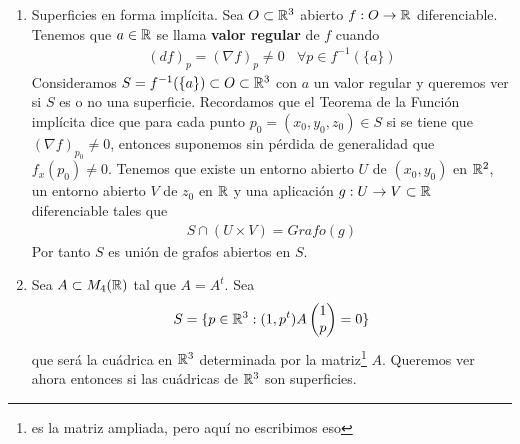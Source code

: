 \begin{ejemplo}
\begin{enumerate}
        Sea $S=S^2(c, R)$, entonces existen una traslación $T$ y una homotecia $H$ de $\bb{R}^3$ tales que 
        \begin{gather*}
            (H\circ T)(S^2) = S^2(c,R)
        \end{gather*}
        por lo que $S^2(c, R)$ es una superficie. Con este razonamiento llegamos a que las elipsoides también son superficies.

        \item Superficies en forma implícita. Sea $O\subset \mathbb{R}^3$ abierto $f:O\to \mathbb{R}$ diferenciable. Tenemos que $a\in \mathbb{R}$ se llama \textbf{valor regular} de $f$ cuando
        \begin{gather*}
            (df)_p = (\nabla f)_p \neq 0 \ \ \ \ \forall p\in f^{-1}(\{a\})
        \end{gather*}
        Consideramos $S=f^{-1}(\{a\})\subset O \subset \mathbb{R}^3$ con $a$ un valor regular y queremos ver si $S$ es o no una superficie. Recordamos que el Teorema de la Función implícita dice que para cada punto $p_0 = (x_0, y_0, z_0)\in S$ si se tiene que $(\nabla f)_{p_0}\neq 0$, entonces suponemos sin pérdida de generalidad que $f_x(p_0)\neq 0$. Tenemos que existe un entorno abierto $U$ de $(x_0,y_0)$ en $\mathbb{R}^2$, un entorno abierto $V$ de $z_0$ en $\mathbb{R}$ y una aplicación $g:U\to V\subset \mathbb{R}$ diferenciable tales que 
        \begin{gather*}
            S \cap (U\times V) = Grafo(g)
        \end{gather*}
        Por tanto $S$ es unión de grafos abiertos en $S$.

        \item Sea $A\subset M_4(\mathbb{R})$ tal que $A=A^t$. Sea
        \begin{gather*}
            S = \{p\in \mathbb{R}^3 : (1,p^t)A \begin{pmatrix} 1\\p\end{pmatrix} = 0\} 
        \end{gather*}
        que será la cuádrica en $\bb{R}^3$ determinada por la matriz\footnote{es la matriz ampliada, pero aquí no escribimos eso} $A$. Queremos ver ahora entonces si las cuádricas de $\bb{R}^3$ son superficies.\\


\end{enumerate}
\end{ejemplo}
